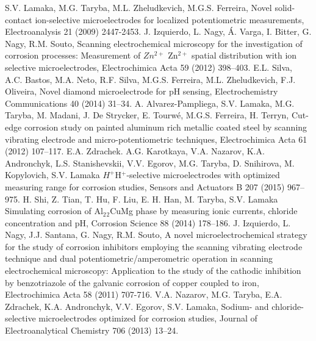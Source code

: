 \documentclass[3p]{elsarticle}
\providecommand{\DIFadd}[1]{{\protect\color{blue}#1}} %
\providecommand{\DIFdel}[1]{{\protect\color{red}\sout{#1}}}                      %
\providecommand{\DIFaddbegin}{} %
\providecommand{\DIFaddend}{} %
\providecommand{\DIFdelbegin}{} %
\providecommand{\DIFdelend}{} %
\begin{document}
\begin{thebibliography}{5}

S.V. Lamaka, M.G. Taryba, M.L. Zheludkevich, M.G.S. Ferreira, Novel solid-contact ion-selective microelectrodes for localized potentiometric measurements, Electroanalysis 21 (2009) 2447-2453.
J. Izquierdo, L. Nagy, Á. Varga, I. Bitter, G. Nagy, R.M. Souto, Scanning electrochemical microscopy for the investigation of corrosion processes: Measurement of  \DIFdelbegin \DIFdel{$Zn^{2+}$ }\DIFdelend \DIFaddbegin \DIFadd{Zn$^{2+}$ }\DIFaddend spatial distribution with ion selective microelectrodes, Electrochimica Acta 59 (2012) 398–403. 
E.L. Silva, A.C. Bastos, M.A. Neto, R.F. Silva, M.G.S. Ferreira, M.L. Zheludkevich, F.J. Oliveira, Novel diamond microelectrode for pH sensing, Electrochemistry Communications 40 (2014) 31–34.
A. Alvarez-Pampliega, S.V. Lamaka, M.G. Taryba, M. Madani, J. De Strycker, E. Tourwé, M.G.S. Ferreira, H. Terryn, Cut-edge corrosion study on painted aluminum rich metallic coated steel by scanning vibrating electrode and micro-potentiometric techniques\DIFaddbegin \DIFadd{, }\DIFaddend Electrochimica Acta 61 (2012) 107–117.	
E.A. Zdrachek. A.G. Karotkaya, V.A. Nazarov, K.A. Andronchyk, L.S. Stanishevskii, V.V. Egorov, M.G. Taryba, D. Snihirova, M. Kopylovich, S.V. Lamaka \DIFdelbegin \DIFdel{$H^{+}$}\DIFdelend \DIFaddbegin \DIFadd{H$^{+}$}\DIFaddend -selective microelectrodes with optimized measuring range for corrosion studies, Sensors and Actuators B 207 (2015) 967–975.
H. Shi, Z. Tian, T. Hu, F. Liu, E. H. Han, M. Taryba, S.V. Lamaka Simulating corrosion of Al\DIFdelbegin \DIFdel{$_{2}$}\DIFdelend \DIFaddbegin \DIFadd{$_2$}\DIFaddend CuMg phase by measuring ionic currents, chloride concentration and pH, Corrosion Science 88 (2014) 178–186.
J. Izquierdo, L. Nagy, J.J. Santana, G. Nagy, R.M. Souto, A novel microelectrochemical strategy for the study of corrosion inhibitors employing the scanning vibrating electrode technique and dual potentiometric/amperometric operation in scanning electrochemical microscopy: Application to the study of the cathodic inhibition by benzotriazole of the galvanic corrosion of copper coupled to iron, Electrochimica Acta 58 (2011) 707-716.
V.A. Nazarov, M.G. Taryba, E.A. Zdrachek, K.A. Andronchyk, V.V. Egorov, S.V. Lamaka, Sodium- and chloride-selective microelectrodes optimized for corrosion studies, Journal of Electroanalytical Chemistry 706 (2013) 13–24.

\end{thebibliography}
\end{document}
